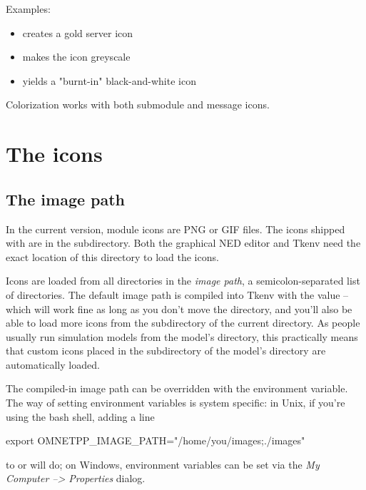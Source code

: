 Examples:

\begin{itemize}
  \item {} creates a gold server icon
  \item {} makes the icon greyscale
  \item {} yields a "burnt-in" black-and-white icon
\end{itemize}

Colorization works with both submodule and message icons.


\section{The icons}
\label{sec:ch-graphics:icon-library}

\subsection{The image path}

In the current {\opp} version, module icons are PNG or GIF files. The icons shipped
with {\opp} are in the  subdirectory. Both the graphical NED editor
and Tkenv need the exact location of this directory to load the icons.

Icons are loaded from all directories in the \textit{image path},
a semicolon-separated list of directories.
The default image path is compiled into Tkenv with the value
 -- which will work fine
as long as you don't move the directory, and you'll also be able to
load more icons from the  subdirectory of the current
directory. As people usually run simulation models from the model's
directory, this practically means that custom icons placed in the
 subdirectory of the model's directory are automatically
loaded.

The compiled-in image path can be overridden with the 
environment variable. The way of setting environment variables is system
specific: in Unix, if you're using the bash shell, adding a line

\begin{commandline}
export OMNETPP_IMAGE_PATH="/home/you/images;./images"
\end{commandline}

to  or  will do; on Windows, environment variables
can be set via the \textit{My Computer --> Properties} dialog.

